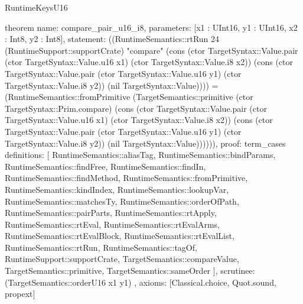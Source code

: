 \begin{lexlean}{RuntimeKeysU16}
\begin{semanticmodule}
theorem{
  name: compare_pair_u16_i8,
  parameters: [x1 : UInt16, y1 : UInt16, x2 : Int8, y2 : Int8],
  statement: ((RuntimeSemantics::rtRun 24 (RuntimeSupport::supportCrate) "compare" (cons (ctor TargetSyntax::Value.pair (ctor TargetSyntax::Value.u16 x1) (ctor TargetSyntax::Value.i8 x2)) (cons (ctor TargetSyntax::Value.pair (ctor TargetSyntax::Value.u16 y1) (ctor TargetSyntax::Value.i8 y2)) (nil TargetSyntax::Value)))) = (RuntimeSemantics::fromPrimitive (TargetSemantics::primitive (ctor TargetSyntax::Prim.compare) (cons (ctor TargetSyntax::Value.pair (ctor TargetSyntax::Value.u16 x1) (ctor TargetSyntax::Value.i8 x2)) (cons (ctor TargetSyntax::Value.pair (ctor TargetSyntax::Value.u16 y1) (ctor TargetSyntax::Value.i8 y2)) (nil TargetSyntax::Value)))))),
  proof: term_cases{
    definitions: [
      RuntimeSemantics::aliasTag,
      RuntimeSemantics::bindParams,
      RuntimeSemantics::findFree,
      RuntimeSemantics::findIn,
      RuntimeSemantics::findMethod,
      RuntimeSemantics::fromPrimitive,
      RuntimeSemantics::kindIndex,
      RuntimeSemantics::lookupVar,
      RuntimeSemantics::matchesTy,
      RuntimeSemantics::orderOfPath,
      RuntimeSemantics::pairParts,
      RuntimeSemantics::rtApply,
      RuntimeSemantics::rtEval,
      RuntimeSemantics::rtEvalArms,
      RuntimeSemantics::rtEvalBlock,
      RuntimeSemantics::rtEvalList,
      RuntimeSemantics::rtRun,
      RuntimeSemantics::tagOf,
      RuntimeSupport::supportCrate,
      TargetSemantics::compareValue,
      TargetSemantics::primitive,
      TargetSemantics::sameOrder
    ],
    scrutinee: (TargetSemantics::orderU16 x1 y1)
  },
  axioms: [Classical.choice, Quot.sound, propext]
}


\end{semanticmodule}
\end{lexlean}

